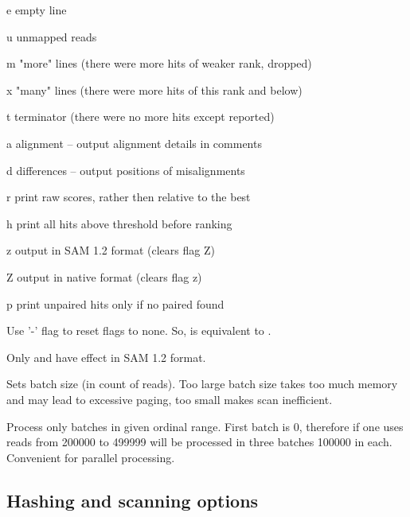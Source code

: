 \documentclass[english]{article}
\begin{document}
\begin{description}
	\begin{Description}[w]
	\item[e] empty line
    \item[u] unmapped reads
    \item[m] "more" lines (there were more hits of weaker rank, dropped)
    \item[x] "many" lines (there were more hits of this rank and below)
    \item[t] terminator (there were no more hits except reported)
    \item[a] alignment -- output alignment details in comments 
    \item[d] differences -- output positions of misalignments
    \item[r] print raw scores, rather then relative to the best
    \item[h] print all hits above threshold before ranking
	\item[z] output in SAM 1.2 format (clears flag Z)
	\item[Z] output in native format (clears flag z)
	\item[p] print unpaired hits only if no paired found
	\end{Description}

                Use '-' flag to reset flags to none. So,   is
                equivalent to .

				Only  and  have effect in SAM 1.2 format.
\item[\OptArg{--batch-size}{=count}~~\OptArg{-B}{~count}]
				Sets batch size (in count of reads). Too large batch size
                takes too much memory and may lead to excessive paging, too
                small makes scan inefficient. 
\item[\OptArg{--batch-range}{=min\Lbr-max\Rbr}]
                Process only batches in given ordinal range. First batch is 0,
                therefore if one uses   reads from 
                200000 to 499999 will be processed in three batches 100000 in
                each. Convenient for parallel processing.
\end{description}

\subsection{Hashing and scanning options}
\end{document}

